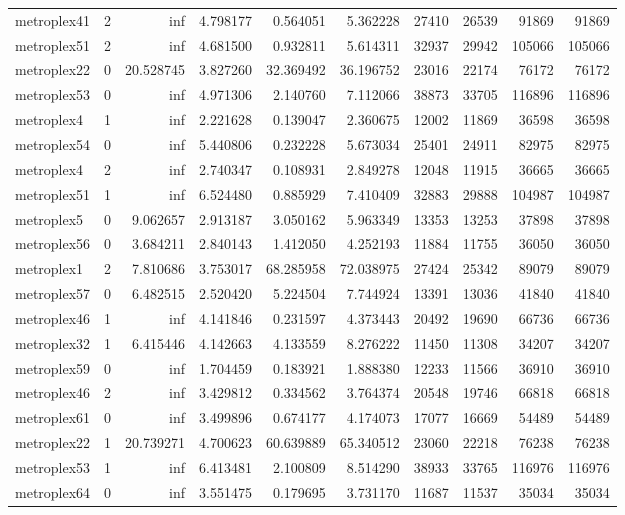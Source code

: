 \begin{longtable}{|l|r|r|r|r|r|r|r|r|r|}
metroplex41 & 2 & inf & 4.798177 & 0.564051 & 5.362228 & 27410 & 26539 & 91869 & 91869 \\
metroplex51 & 2 & inf & 4.681500 & 0.932811 & 5.614311 & 32937 & 29942 & 105066 & 105066 \\
metroplex22 & 0 & 20.528745 & 3.827260 & 32.369492 & 36.196752 & 23016 & 22174 & 76172 & 76172 \\
metroplex53 & 0 & inf & 4.971306 & 2.140760 & 7.112066 & 38873 & 33705 & 116896 & 116896 \\
metroplex4 & 1 & inf & 2.221628 & 0.139047 & 2.360675 & 12002 & 11869 & 36598 & 36598 \\
metroplex54 & 0 & inf & 5.440806 & 0.232228 & 5.673034 & 25401 & 24911 & 82975 & 82975 \\
metroplex4 & 2 & inf & 2.740347 & 0.108931 & 2.849278 & 12048 & 11915 & 36665 & 36665 \\
metroplex51 & 1 & inf & 6.524480 & 0.885929 & 7.410409 & 32883 & 29888 & 104987 & 104987 \\
metroplex5 & 0 & 9.062657 & 2.913187 & 3.050162 & 5.963349 & 13353 & 13253 & 37898 & 37898 \\
metroplex56 & 0 & 3.684211 & 2.840143 & 1.412050 & 4.252193 & 11884 & 11755 & 36050 & 36050 \\
metroplex1 & 2 & 7.810686 & 3.753017 & 68.285958 & 72.038975 & 27424 & 25342 & 89079 & 89079 \\
metroplex57 & 0 & 6.482515 & 2.520420 & 5.224504 & 7.744924 & 13391 & 13036 & 41840 & 41840 \\
metroplex46 & 1 & inf & 4.141846 & 0.231597 & 4.373443 & 20492 & 19690 & 66736 & 66736 \\
metroplex32 & 1 & 6.415446 & 4.142663 & 4.133559 & 8.276222 & 11450 & 11308 & 34207 & 34207 \\
metroplex59 & 0 & inf & 1.704459 & 0.183921 & 1.888380 & 12233 & 11566 & 36910 & 36910 \\
metroplex46 & 2 & inf & 3.429812 & 0.334562 & 3.764374 & 20548 & 19746 & 66818 & 66818 \\
metroplex61 & 0 & inf & 3.499896 & 0.674177 & 4.174073 & 17077 & 16669 & 54489 & 54489 \\
metroplex22 & 1 & 20.739271 & 4.700623 & 60.639889 & 65.340512 & 23060 & 22218 & 76238 & 76238 \\
metroplex53 & 1 & inf & 6.413481 & 2.100809 & 8.514290 & 38933 & 33765 & 116976 & 116976 \\
metroplex64 & 0 & inf & 3.551475 & 0.179695 & 3.731170 & 11687 & 11537 & 35034 & 35034 \\

\end{longtable}
